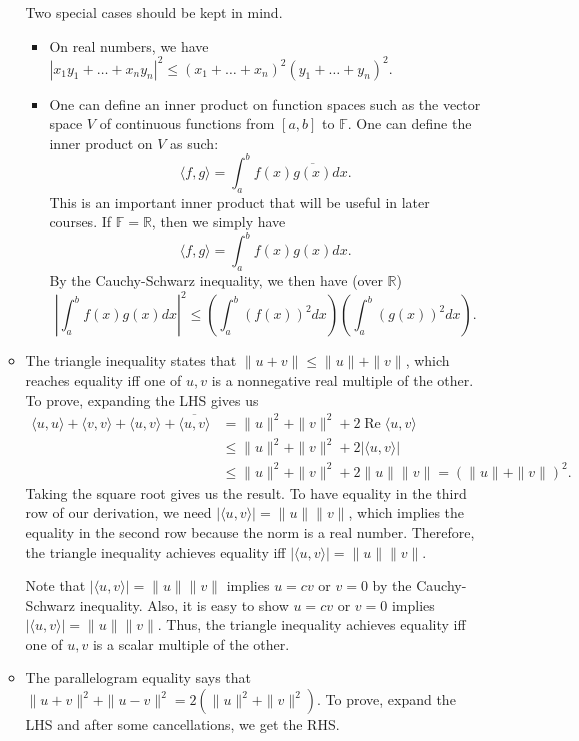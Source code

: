 \documentclass{article}
\newcommand{\R}{\mathbb{R}}
\newcommand{\F}{\mathbb{F}}
\renewcommand{\Re}{\operatorname{Re}}
\newcommand{\conj}[1]{\overline{#1}}
\newcommand{\inp}[2]{\langle #1, #2 \rangle}
\newcommand{\nm}[1]{\| #1 \|}
\begin{document}
\begin{itemize}
\begin{itemize}
        Two special cases should be kept in mind.
        \begin{itemize}
            \item On real numbers, we have $|x_1y_1+\dots+x_ny_n|^2 \leq (x_1+\dots+x_n)^2(y_1+\dots+y_n)^2$.
            \item One can define an inner product on function spaces such as the vector space $V$ of continuous functions from $[a,b]$ to $\F$. One can define the inner product on $V$ as such: $$\inp{f}{g} = \int_a^b f(x)\conj{g(x)} dx.$$ This is an important inner product that will be useful in later courses. If $\F = \R$, then we simply have $$\inp{f}{g} = \int_a^b f(x)g(x) dx.$$ By the Cauchy-Schwarz inequality, we then have (over $\R$) $$\left|\int_a^b f(x)g(x)dx\right|^2 \leq \left(\int_a^b (f(x))^2 dx \right) \left(\int_a^b (g(x))^2 dx \right).$$
        \end{itemize}
        \item The triangle inequality states that $\|u+v\| \leq \|u\|+\|v\|$, which reaches equality iff one of $u,v$ is a nonnegative real multiple of the other.
        To prove, expanding the LHS gives us
        \begin{align*}
            \inp{u}{u}+\inp{v}{v}+\inp{u}{v}+\conj{\inp{u}{v}} & = \nm{u}^2+\nm{v}^2+2 \Re{\inp{u}{v}} \\ & \leq \nm{u}^2+\nm{v}^2+2|\inp{u}{v}| \\ & \leq \nm{u}^2+\nm{v}^2+2\nm{u}\nm{v} = (\nm{u}+\nm{v})^2.
        \end{align*}
        Taking the square root gives us the result. To have equality in the third row of our derivation, we need $|\inp{u}{v}| = \nm{u}\nm{v}$, which implies the equality in the second row because the norm is a real number. Therefore, the triangle inequality achieves equality iff $|\inp{u}{v}| = \nm{u}\nm{v}$.
        
        Note that $|\inp{u}{v}| = \nm{u}\nm{v}$ implies $u=cv$ or $v=0$ by the Cauchy-Schwarz inequality. Also, it is easy to show $u=cv$ or $v=0$ implies $|\inp{u}{v}| = \nm{u}\nm{v}$. Thus, the triangle inequality achieves equality iff one of $u,v$ is a scalar multiple of the other.
        \item The parallelogram equality says that $\|u+v\|^2+\|u-v\|^2 = 2(\|u\|^2+ \|v\|^2)$. To prove, expand the LHS and after some cancellations, we get the RHS.
    \end{itemize}
\end{itemize}
\end{document}
